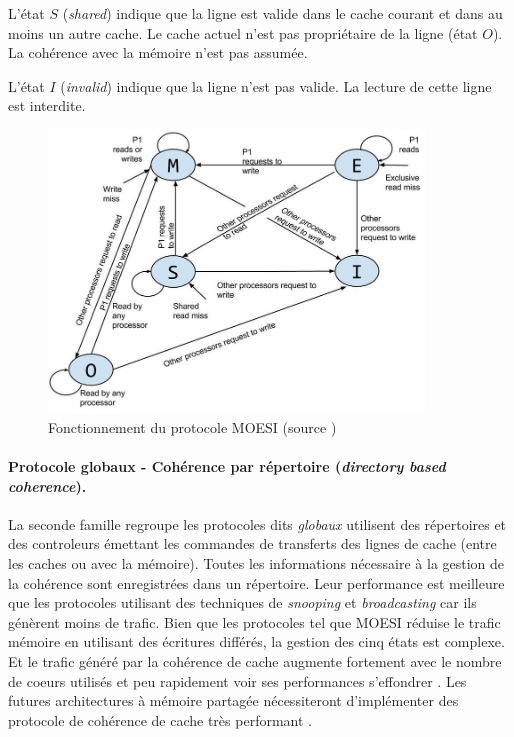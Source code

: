 L'état $S$ (\textit{shared}) indique que la ligne est valide dans le cache courant et dans au moins un autre cache. Le cache actuel n'est pas propriétaire de la ligne (état $O$). La cohérence avec la mémoire n'est pas assumée. 

L'état $I$ (\textit{invalid}) indique que la ligne n'est pas valide. La lecture de cette ligne est interdite.


\begin{figure}
    \center
    \includegraphics[width=10cm]{images/moesi.png}
    \caption{\label{pic:moesi} Fonctionnement du protocole MOESI (source \cite{Sayin2014})}
\end{figure}





\paragraph{Protocole globaux - Cohérence par répertoire (\textit{directory based coherence}).}

La seconde famille regroupe les protocoles dits \textit{globaux} utilisent des répertoires et des controleurs émettant les commandes de transferts des lignes de cache (entre les caches ou avec la mémoire)\cite{tang1976cache}. Toutes les informations nécessaire à la gestion de la cohérence sont enregistrées dans un répertoire. Leur performance est meilleure que les protocoles utilisant des techniques de \textit{snooping} et \textit{broadcasting} car ils génèrent moins de trafic. Bien que les protocoles tel que MOESI réduise le trafic mémoire en utilisant des écritures différés, la gestion des cinq états est complexe. Et le trafic généré par la cohérence de cache augmente fortement avec le nombre de coeurs utilisés et peu rapidement voir ses performances s'effondrer \cite{liu2016protocoles}. Les futures architectures à mémoire partagée nécessiteront d'implémenter des protocole de cohérence de cache très performant  \cite{al2010snoopy}.






